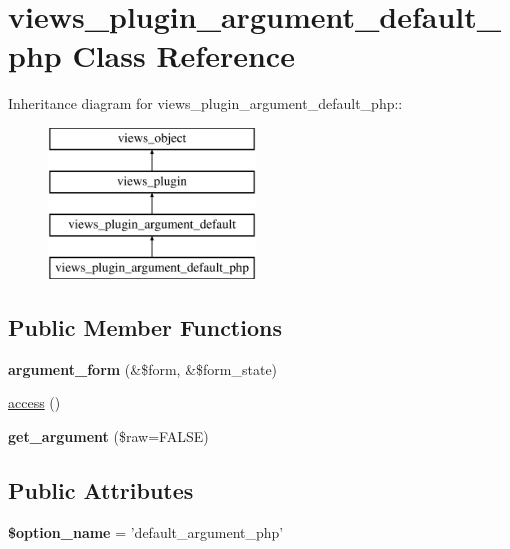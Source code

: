 \hypertarget{classviews__plugin__argument__default__php}{
\section{views\_\-plugin\_\-argument\_\-default\_\-php Class Reference}
\label{classviews__plugin__argument__default__php}
}
Inheritance diagram for views\_\-plugin\_\-argument\_\-default\_\-php::\begin{figure}[H]
\begin{center}
\leavevmode
\includegraphics[height=4cm]{classviews__plugin__argument__default__php}
\end{center}
\end{figure}
\subsection*{Public Member Functions}
\begin{CompactItemize}
\item 
\hypertarget{classviews__plugin__argument__default__php_dd34b0a8c3a0a07c2dee3468e698f2fc}{
\textbf{argument\_\-form} (\&\$form, \&\$form\_\-state)}
\label{classviews__plugin__argument__default__php_dd34b0a8c3a0a07c2dee3468e698f2fc}

\item 
\hyperlink{classviews__plugin__argument__default__php_ff864fbd2dcbea7ecd3589429bbf3a2a}{access} ()
\item 
\hypertarget{classviews__plugin__argument__default__php_27109996d5d31691c1be7b919b6c728f}{
\textbf{get\_\-argument} (\$raw=FALSE)}
\label{classviews__plugin__argument__default__php_27109996d5d31691c1be7b919b6c728f}

\end{CompactItemize}
\subsection*{Public Attributes}
\begin{CompactItemize}
\item 
\hypertarget{classviews__plugin__argument__default__php_9b335634524bb33834427ce64e10ebb4}{
\textbf{\$option\_\-name} = 'default\_\-argument\_\-php'}
\label{classviews__plugin__argument__default__php_9b335634524bb33834427ce64e10ebb4}

\end{CompactItemize}


